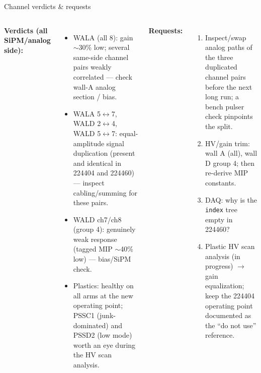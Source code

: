\documentclass[aspectratio=169,10pt]{beamer}
\begin{document}
\begin{frame}{Channel verdicts \& requests}
\small
\begin{columns}[T]
\textbf{Verdicts (all SiPM/analog side):}
\begin{itemize}
\item WALA (all 8): gain $\sim$30\% low; several same-side channel pairs weakly
      correlated --- check wall-A analog section / bias.
\item WALA 5$\leftrightarrow$7, WALD 2$\leftrightarrow$4, WALD 5$\leftrightarrow$7:
      equal-amplitude signal duplication (present and identical in 224404 and
      224460) --- inspect cabling/summing for these pairs.
\item WALD ch7/ch8 (group 4): genuinely weak response (tagged MIP $\sim$40\% low)
      --- bias/SiPM check.
\item Plastics: healthy on all arms at the new operating point; PSSC1 (junk-dominated)
      and PSSD2 (low mode) worth an eye during the HV scan analysis.
\end{itemize}
\textbf{Requests:}
\begin{enumerate}
\item Inspect/swap analog paths of the three duplicated channel pairs before
      the next long run; a bench pulser check pinpoints the split.
\item HV/gain trim: wall A (all), wall D group 4; then re-derive MIP constants.
\item DAQ: why is the \texttt{index} tree empty in 224460?
\item Plastic HV scan analysis (in progress) $\to$ gain equalization; keep the
      224404 operating point documented as the ``do not use'' reference.
\end{enumerate}
\end{columns}
\end{frame}
\end{document}
